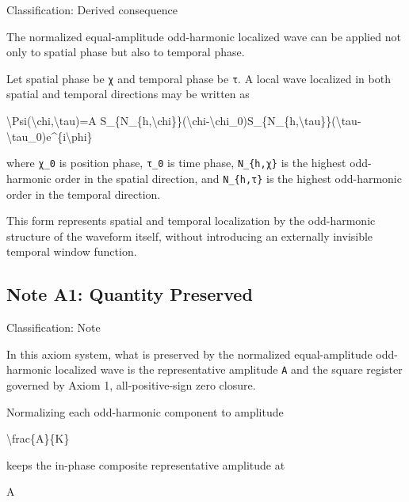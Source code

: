 \documentclass[
  a4paper]{article}
\newenvironment{Shaded}{}{}
\newcommand{\NormalTok}[1]{#1}
\begin{document}
Classification: Derived consequence

The normalized equal-amplitude odd-harmonic localized wave can be
applied not only to spatial phase but also to temporal phase.

Let spatial phase be \texttt{χ} and temporal phase be \texttt{τ}. A
local wave localized in both spatial and temporal directions may be
written as

\begin{Shaded}
\begin{Highlighting}[]
\NormalTok{\textbackslash{}Psi(\textbackslash{}chi,\textbackslash{}tau)=A S\_\{N\_\{h,\textbackslash{}chi\}\}(\textbackslash{}chi{-}\textbackslash{}chi\_0)S\_\{N\_\{h,\textbackslash{}tau\}\}(\textbackslash{}tau{-}\textbackslash{}tau\_0)e\^{}\{i\textbackslash{}phi\}}
\end{Highlighting}
\end{Shaded}

where \texttt{χ\_0} is position phase, \texttt{τ\_0} is time phase,
\texttt{N\_\{h,χ\}} is the highest odd-harmonic order in the spatial
direction, and \texttt{N\_\{h,τ\}} is the highest odd-harmonic order in
the temporal direction.

This form represents spatial and temporal localization by the
odd-harmonic structure of the waveform itself, without introducing an
externally invisible temporal window function.

\subsection{Note A1: Quantity
Preserved}\label{note-a1-quantity-preserved}

Classification: Note

In this axiom system, what is preserved by the normalized
equal-amplitude odd-harmonic localized wave is the representative
amplitude \texttt{A} and the square register governed by Axiom 1,
all-positive-sign zero closure.

Normalizing each odd-harmonic component to amplitude

\begin{Shaded}
\begin{Highlighting}[]
\NormalTok{\textbackslash{}frac\{A\}\{K\}}
\end{Highlighting}
\end{Shaded}

keeps the in-phase composite representative amplitude at

\begin{Shaded}
\begin{Highlighting}[]
\NormalTok{A}
\end{Highlighting}
\end{Shaded}
\end{document}
